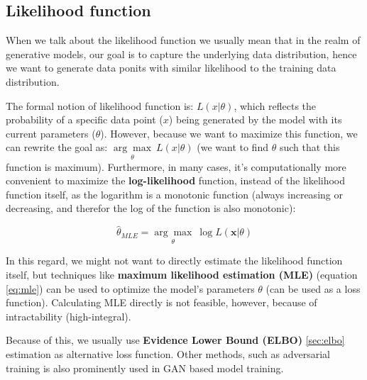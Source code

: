 \subsection{Likelihood function}
\label{appendix:likelihood_function}

When we talk about the likelihood function we usually mean that in the realm of generative models, our goal is to capture the underlying data distribution, hence we want to generate data ponits with similar likelihood to the training data distribution. 

The formal notion of likelihood function is: $L(x | \theta)$, which reflects the probability of a specific data point ($x$) being generated by the model with its current parameters ($\theta$). However, because we want to maximize this function, we can rewrite the goal as: $\underset{\theta}{\arg\max}\ L(x | \theta)$ (we want to find $\theta$ such that this function is maximum). Furthermore, in many cases, it's computationally more convenient to maximize the \textbf{log-likelihood} function, instead of the likelihood function itself, as the logarithm is a monotonic function (always increasing or decreasing, and therefor the log of the function is also monotonic):

\begin{equation}
\label{eq:mle}
    \hat{\theta}_{MLE} = \underset{\theta}{\arg\max} \ \log L(\mathbf{x} | \theta)
\end{equation}


In this regard, we might not want to directly estimate the likelihood function itself, but techniques like \textbf{maximum likelihood estimation (MLE)} (equation \ref{eq:mle}) can be used to optimize the model's parameters $\theta$ (can be used as a loss function). Calculating MLE directly is not feasible, however, because of intractability (high-integral).

Because of this, we usually use \textbf{Evidence Lower Bound (ELBO)} \ref{sec:elbo} estimation as alternative loss function. Other methods, such as adversarial training is also prominently used in GAN based model training.